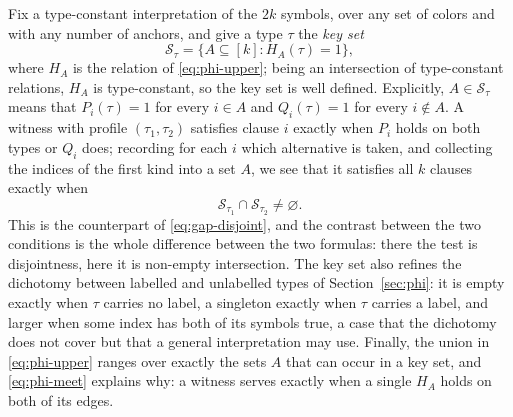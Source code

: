 Fix a type-constant interpretation of the $2k$ symbols, over any set of
colors and with any number of anchors, and give a type $\tau$ the
\emph{key set}
\[
 \mathcal S_\tau=\bigl\{A\subseteq[k]:H_A(\tau)=1\bigr\},
\]
where $H_A$ is the relation of \eqref{eq:phi-upper}; being an intersection
of type-constant relations, $H_A$ is type-constant, so the key set is well
defined. Explicitly, $A\in\mathcal S_\tau$ means that $P_i(\tau)=1$ for
every $i\in A$ and $Q_i(\tau)=1$ for every $i\notin A$. A witness with
profile $(\tau_1,\tau_2)$ satisfies clause $i$ exactly when $P_i$ holds on
both types or $Q_i$ does; recording for each $i$ which alternative is taken,
and collecting the indices of the first kind into a set $A$, we see that it
satisfies all $k$ clauses exactly when
\begin{equation}\label{eq:phi-meet}
 \mathcal S_{\tau_1}\cap\mathcal S_{\tau_2}\ne\varnothing .
\end{equation}
This is the counterpart of \eqref{eq:gap-disjoint}, and the contrast between
the two conditions is the whole difference between the two formulas: there
the test is disjointness, here it is non-empty intersection. The key set
also refines the dichotomy between labelled and unlabelled types of
Section~\ref{sec:phi}: it is empty exactly when $\tau$ carries no label, a singleton exactly
when $\tau$ carries a label, and larger when some index has both of its
symbols true, a case that the dichotomy does not cover but that a general
interpretation may use. Finally, the union in \eqref{eq:phi-upper} ranges
over exactly the sets $A$ that can occur in a key set, and
\eqref{eq:phi-meet} explains why: a witness serves exactly when a single
$H_A$ holds on both of its edges.

